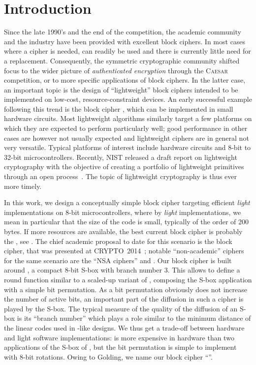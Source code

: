 \section{Introduction}
Since the late 1990's and the end of the \aes competition, the academic community and the industry have been provided with excellent block ciphers.
In most cases where a cipher is needed, \aes \cite{rijndael} can readily be used and there is currently little need for a replacement.
Consequently, the symmetric cryptographic community shifted focus to \eg the wider picture of \emph{authenticated encryption} through
the \textsc{Caesar} competition, or to more specific applications of block ciphers. In the latter case, an important topic is
the design of ``lightweight'' block ciphers intended to be implemented on low-cost, resource-constraint devices. An early
successful example following this trend is the block cipher \present \cite{present}, which can be implemented in small hardware circuits.
Most lightweight algorithms similarly target a few platforms on which they are expected to perform particularly well;
good performance in other cases are however not usually expected and lightweight ciphers are in general not very versatile.
Typical platforms of interest include hardware circuits and 8-bit to 32-bit microcontrollers.
Recently, NIST released a draft report on lightweight cryptography with the objective of creating a portfolio of lightweight primitives
through an open process~\cite{NistLightDraft}. The topic of lightweight cryptography is thus ever more timely. 

In this work, we design a conceptually simple block cipher targeting efficient \emph{light} implementations on 8-bit microcontrollers, where
by \emph{light} implementations,
we mean in particular that the size of the code is small, typically of the order of 200 bytes. If more resources are available, the best current block cipher is
probably the \aes, see \eg \cite{DBLP:journals/iacr/BeaulieuSSTWW15}.
The chief academic proposal to date for this scenario is the \pride block cipher,
that was presented at CRYPTO~2014~\cite{pride};
notable
``non-academic'' ciphers for the same scenario are the ``NSA ciphers'' \simon and \speck \cite{NSAciph}.
Our block cipher is built around \littlunOne, a compact 8-bit S-box with branch number 3. This allows
to define a round function similar to a scaled-up variant of \present, composing the S-box application with a simple bit permutation. As a bit permutation
obviously does not increase the number of active bits, an important part of the diffusion in such a cipher is played by the S-box. The typical measure of the quality
of the diffusion of an S-box is its ``branch number'' which plays a role similar to the minimum distance of the linear codes used in \aes-like designs.
We thus get a trade-off between hardware and light software implementations: \littlunOne is more expensive in hardware than two applications
of the S-box of \present, but the bit permutation is simple to implement with 8-bit rotations. Owing to Golding, we name our
block cipher ``\fly''.

